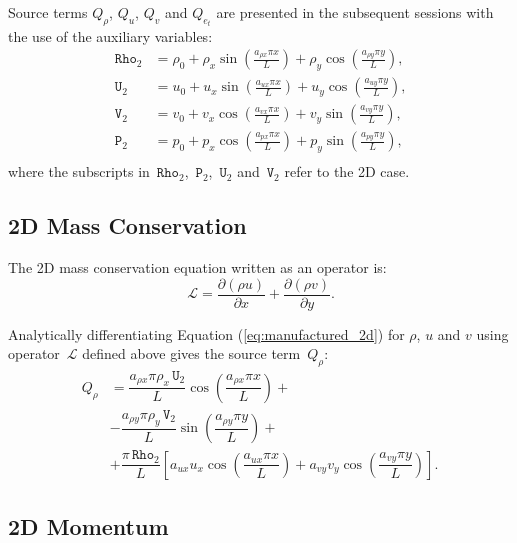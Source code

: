 \documentclass[10pt]{article}
\newcommand{\Diff}[2] {\dfrac{\partial( #1)}{\partial #2}}
\newcommand{\Rho}{\,\mathtt{Rho}}
\newcommand{\PP}{\,\mathtt{P}}
\newcommand{\U}{\,\mathtt{U}}
\newcommand{\V}{\,\mathtt{V}}
\newcommand{\Lo}{\,\mathcal{L}}
\begin{document}
Source terms $Q_\rho$, $Q_u$, $Q_v$ and $Q_{e_t}$ are presented in the subsequent sessions with the use of the auxiliary variables:
\begin{equation*}
 \begin{split}
\label{eq:aux_2d}
\Rho_2 &= \rho_{0}+ \rho_{x} \sin\left(\frac{a_{ \rho x} \pi x}{L}\right)+ \rho_{y} \cos\left(\frac{a_{ \rho y} \pi y}{L}\right),\\
\U_2 &= u_{0}+u_{x} \sin\left(\frac{a_{u x} \pi x}{L}\right)+u_{y} \cos\left(\frac{a_{u y} \pi y}{L}\right),\\
\V_2 &= v_{0}+v_{x} \cos\left(\frac{a_{v x} \pi x}{L}\right)+v_{y} \sin\left(\frac{a_{v y} \pi y}{L}\right),\\
\PP_2 &= p_{0}+p_{x} \cos\left(\frac{a_{p x} \pi x}{L}\right)+p_{y} \sin\left(\frac{a_{p y} \pi y}{L}\right),\\
\end{split}
\end{equation*}
%
where the subscripts in $\Rho_2$, $\PP_2$, $\U_2$ and $\V_2$ refer to the 2D case.

\subsection{2D Mass Conservation}

The 2D mass conservation equation written as an operator is:
\begin{equation*}
 \Lo=  \Diff{\rho u}{x}+\Diff{\rho v}{y}.
\end{equation*}

Analytically differentiating Equation (\ref{eq:manufactured_2d}) for $\rho$, $u$ and $v$ using operator $\Lo$ defined above gives  the source term~$Q_{\rho}$:
\begin{equation}
 \begin{split}
Q_\rho &= \dfrac{a_{\rho x} \pi \rho_x \U_2 }{L}\cos\left(\dfrac{a_{\rho x} \pi x}{L}\right)+\\
&-\dfrac{a_{\rho y} \pi \rho_y \V_2 }{L}\sin\left(\dfrac{a_{\rho y} \pi y}{L}\right)+\\
&+\dfrac{\pi \Rho_2}{L}\left[a_{ux} u_x \cos\left(\dfrac{a_{ux} \pi x}{L}\right)+a_{vy} v_y \cos\left(\dfrac{a_{vy} \pi y}{L}\right)\right].
 \end{split}
\end{equation}

\subsection{2D Momentum}
\end{document}
